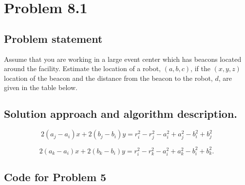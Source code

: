 \documentclass[letterpaper,11pt]{texMemo} %
\begin{document}
\maketitle %


\section*{Problem 8.1}
\subsection*{Problem statement}
Assume that you are working in a large event center which has beacons located around the 
facility. Estimate the location of a robot, $(a,b,c)$, if the $(x,y,z)$ location of the beacon 
and the distance from the beacon to the robot, $d$, are given in the table below.



\subsection*{Solution approach and algorithm description.}


\[
    2(a_j-a_i)x + 2(b_j-b_i)y  = r_i^2 - r_j^2 - a_i^2 + a_j^2 - b_i^2 + b_j^2
\]

\[
    2(a_k-a_i)x + 2(b_k-b_i)y = r_i^2 - r_k^2  - a_i^2 + a_k^2 - b_i^2  + b_k^2  .
\]

%

\newpage
\subsection*{Code for Problem 5}
\begin{tiny}

\end{tiny}
\end{document}
